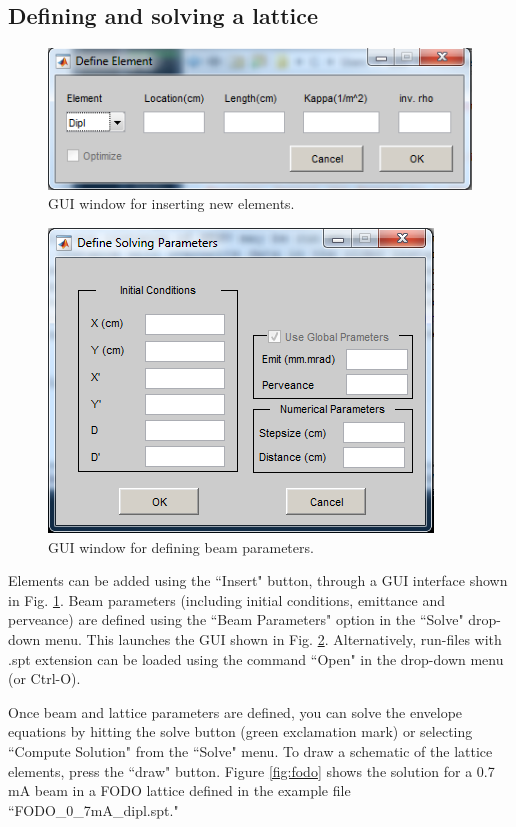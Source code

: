 \documentclass[../menv_main.tex]{subfiles}
\begin{document}
\subsection{Defining and solving a lattice}



\begin{figure}
\centering
\includegraphics{figures/defElement_window.png}
\caption{GUI window for inserting new elements.}
\label{fig:defelement}
\end{figure}

\begin{figure}
\centering
\includegraphics{figures/defparam_window.png}
\caption{GUI window for defining beam parameters.}
\label{fig:defparam}
\end{figure}


Elements can be added using the ``Insert" button, through a GUI interface shown in Fig. \ref{fig:defelement}. Beam parameters (including initial conditions, emittance and perveance) are defined using the ``Beam Parameters" option in the ``Solve" drop-down menu. This launches the GUI shown in Fig. \ref{fig:defparam}. Alternatively, run-files with .spt extension can be loaded using the command ``Open" in the drop-down menu (or Ctrl-O). 

Once beam and lattice parameters are defined, you can solve the envelope equations by hitting the solve button (green exclamation mark) or selecting ``Compute Solution" from the ``Solve" menu. To draw a schematic of the lattice elements, press the ``draw" button. 
Figure \ref{fig:fodo} shows the solution for a 0.7 mA beam in a FODO lattice defined in the example file ``FODO\_0\_7mA\_dipl.spt." 
\end{document}
